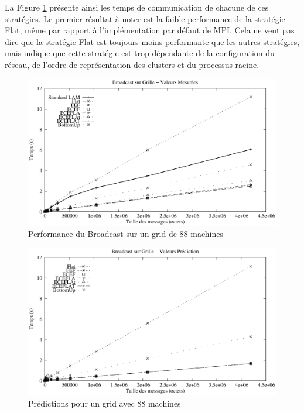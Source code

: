 La Figure \ref{Figure: Bcast - Case1 - Mesure} présente ainsi les temps de communication de chacune de ces stratégies. Le premier résultat à noter est la faible performance de la stratégie
Flat, même par rapport à l'implémentation par défaut de MPI. Cela
ne veut pas dire que la stratégie Flat est toujours moins performante
que les autres stratégies, mais indique que cette stratégie est trop
dépendante de la configuration du réseau, de l'ordre de représentation
des clusters et du processus racine.
%
\begin{figure}[h]
	\begin{centering}
		\includegraphics[width=0.7\linewidth]{images/Grid/Bcast/case1/comp}
		\par\end{centering}
	\caption{\label{Figure: Bcast - Case1 - Mesure}Performance du Broadcast sur
		un grid de 88 machines }	
\end{figure}

\begin{figure}[h]
	\begin{centering}
		\includegraphics[width=0.7\linewidth]{images/Grid/Bcast/case1/simul}
		\par\end{centering}
	
	\caption{\label{Figure: Bcastcase1predictions}Prédictions pour un grid
		avec 88 machines}
	
\end{figure}

